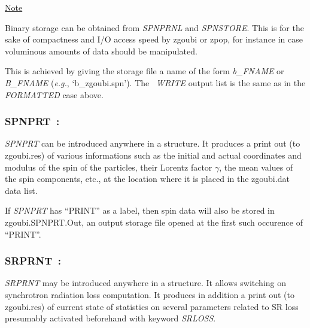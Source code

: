 \medskip

\noindent\underline{Note}

\medskip

\noindent Binary storage can be obtained from \textsl{SPNPRNL} and \textsl{SPNSTORE}. This is for 
the sake of compactness and I/O access speed by zgoubi  or zpop, for instance  in case  voluminous amounts of 
data should be manipulated. 

\noindent This is achieved by giving the storage file a name of the form \textsl{b\_FNAME} 
or \textsl{B\_FNAME}  (\emph{e.g.}, `b\_zgoubi.spn'). The \FORTRAN\ \textsl{WRITE} output list 
is the same as in the \textsl{FORMATTED} case above.  







\newpage

\subsubsection*{SPNPRT~: \SPNPRTTitl}\label{SPNPRT}
\medskip 

\noindent  \textsl{SPNPRT} can be introduced anywhere in a structure. It produces
a print out (to zgoubi.res) of various informations such as 
the initial and actual coordinates and modulus of the spin of the \IMAX{}
particles, their Lorentz factor $\gamma$, 
the mean values of the spin components, etc.,  at the location where it is placed in the zgoubi.dat data list.

\medskip


\noindent  If \textsl{SPNPRT} has ``PRINT'' as a label, then spin data will also be stored in 
zgoubi.SPNPRT.Out, an output storage file opened at the first such occurence of ``PRINT''. 



\newpage

\subsubsection*{SRPRNT~: \SRPRNTTitl}\label{SRPRNT}
\medskip 

\noindent\textsl{SRPRNT} may be introduced anywhere in a structure. It allows switching on 
synchrotron radiation loss computation. It produces in addition 
a print out (to zgoubi.res) of current state of statistics on several parameters related to 
SR loss  presumably  activated beforehand with keyword \textsl{SRLOSS}. 



